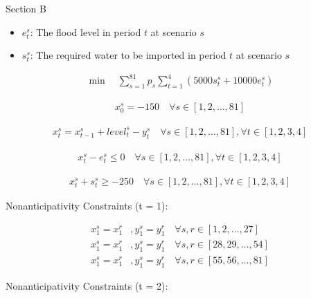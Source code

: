 \documentclass{article}
\begin{document}
\begin{center}
        \large Section B
\end{center}

\par
\begin{itemize}
        \item \(e_{t}^{s}\): The flood level in period \(t\) at scenario \(s\)
        \item \(s_{t}^{s}\): The required water to be imported in period \(t\) at scenario \(s\)
\end{itemize}

\begin{align*}
        \min \quad \sum_{s = 1}^{81} p_{s} \sum_{t = 1}^{4} (5000 s_{t}^{s} + 10000 e_{t}^{s})
\end{align*}

\begin{align*}
        x_{0}^{s} = -150 \quad \forall s \in [1, 2, \ldots, 81]
\end{align*}

\begin{align*}
        x_{t}^{s} = x_{t-1}^{s} + level_{t}^{s} - y_{t}^{s} \quad \forall s \in [1, 2, \ldots, 81], \forall t \in [1, 2, 3, 4]
\end{align*}

\begin{align*}
        x_{t}^{s} - e_{t}^{s} \le 0 \quad \forall s \in [1, 2, \ldots, 81], \forall t \in [1, 2, 3, 4]
\end{align*}

\begin{align*}
        x_{t}^{s} + s_{t}^{s} \ge -250 \quad \forall s \in [1, 2, \ldots, 81], \forall t \in [1, 2, 3, 4]
\end{align*}

\par
Nonanticipativity Constraints (t = 1):

\begin{align*}
        x_{1}^{s} = x_{1}^{r}&, y_{1}^{s} = y_{1}^{r} \quad \forall s, r \in [1, 2, \ldots, 27]\\
        x_{1}^{s} = x_{1}^{r}&, y_{1}^{s} = y_{1}^{r} \quad \forall s, r \in [28, 29, \ldots, 54]\\
        x_{1}^{s} = x_{1}^{r}&, y_{1}^{s} = y_{1}^{r} \quad \forall s, r \in [55, 56, \ldots, 81]
\end{align*}


\par
Nonanticipativity Constraints (t = 2):
\end{document}
